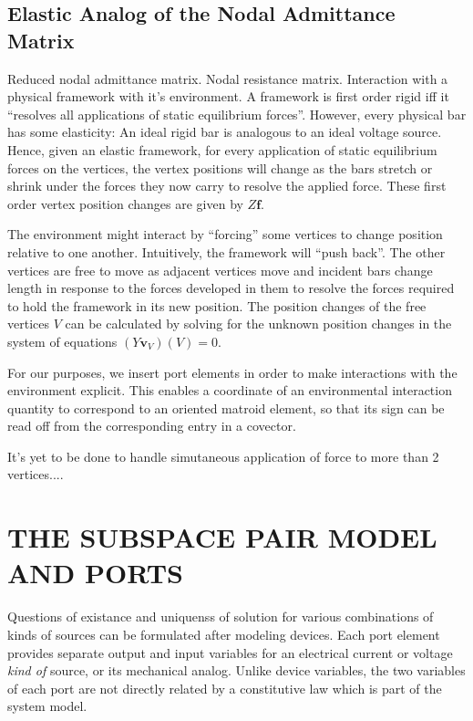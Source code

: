 \documentclass{article}
\newcommand{\extra}[1]{{\small{#1}}}
\begin{document}
\extra{\subsection{Elastic Analog of the Nodal Admittance Matrix}

Reduced nodal admittance matrix.  Nodal resistance matrix.
Interaction with a physical framework with it's environment.
A framework is first order rigid iff it ``resolves all applications of
static equilibrium forces''.  However, every physical bar has some
elasticity:  An ideal rigid bar is analogous to an ideal voltage 
source.  Hence, given an elastic framework, for every application
of static equilibrium forces on the vertices, the vertex positions
will change as the bars stretch or shrink under the forces they now
carry to resolve the applied force.  These first order vertex position 
changes are given by $Z\mathbf{f}$.

The environment might interact by ``forcing'' some vertices to change position
relative to one another.
Intuitively, the framework will ``push back''.  The other vertices are free
to move as adjacent vertices move and incident bars change length in
response to the forces developed in them to resolve the forces required
to hold the framework in its new position.  The position changes of the
free vertices $V$ can be calculated by solving for the unknown position changes
in the system of equations $(Y\mathbf{v}_V)(V)=0$.

For our purposes, we insert port elements in order to make interactions 
with the environment explicit.  This enables a coordinate of an 
environmental interaction quantity to correspond to an oriented matroid
element, so that its sign can be read off from the corresponding entry
in a covector.

It's yet to be done to handle simutaneous application of force to more 
than 2 vertices....
}

\section{THE SUBSPACE PAIR MODEL AND PORTS}


Questions of existance and 
uniquenss of solution for various combinations of 
kinds of sources can be formulated after 
modeling devices.  
Each port element provides separate output and input
variables
for an 
electrical current or 
voltage \textit{kind of} source, or its mechanical analog.
Unlike device variables, the two variables of each port
are not directly related by a constitutive law which is 
part of the system model.
\end{document}
